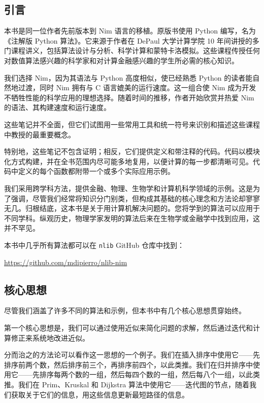 \documentclass[justified, sixbynine]{tufte-book}
\def\ft{\small\tt}
\theoremstyle{plain}%
\newtheorem * {corollary}{推论}
\theoremstyle{definition}
\theoremstyle{remark}
\newtheorem * {remark}{注记}
\newtheorem * {note}{注释}
\begin{document}
\mainmatter
\begin{fullwidth}

\goodbreak\chapter{引言}

本书是同一位作者先前版本到 Nim 语言的移植。原版书使用 Python 编写，名为《注解版 Python 算法》。它来源于作者在 DePaul 大学计算学院 10 年间讲授的多门课程讲义，包括算法设计与分析、科学计算和蒙特卡洛模拟。这些课程传授任何对数值算法感兴趣的科学家和对计算金融感兴趣的学生所必需的核心知识。

我们选择 Nim，因为其语法与 Python 高度相似，使已经熟悉 Python 的读者能自然地过渡，同时 Nim 拥有与 C 语言媲美的运行速度。这一组合使 Nim 成为开发不牺牲性能的科学应用的理想选择。随着时间的推移，作者开始欣赏并热爱 Nim 的语法、其构建速度和运行速度。

这些笔记并不全面，但它们试图用一些常用工具和统一符号来识别和描述这些课程中教授的最重要概念。

特别地，这些笔记不包含证明；相反，它们提供定义和带注释的代码。代码以模块化方式构建，并在全书范围内尽可能多地复用，以便计算的每一步都清晰可见。代码中定义的每个函数都附带一个或多个实际应用示例。

我们采用跨学科方法，提供金融、物理、生物学和计算机科学领域的示例。这是为了强调，尽管我们经常将知识分门别类，但构成其基础的核心理念和方法论却寥寥无几。归根结底，这本书是关于用计算机解决问题的。您将学到的算法可以应用于不同学科。纵观历史，物理学家发明的算法后来在生物学或金融学中找到应用，这并不罕见。

本书中几乎所有算法都可以在 {\ft nlib} GitHub 仓库中找到：

\url{https://github.com/mdipierro/nlib-nim}

\section{核心思想}

尽管我们涵盖了许多不同的算法和示例，但本书中有几个核心思想贯穿始终。

第一个核心思想是，我们可以通过使用近似来简化问题的求解，然后通过迭代和计算修正来系统地改进近似。

分而治之的方法论可以看作这一思想的一个例子。我们在插入排序中使用它——先排序前两个数，然后排序前三个，再排序前四个，以此类推。我们在归并排序中使用它——先排序每两个数的一组，然后每四个数的一组，然后每八个一组，以此类推。我们在 Prim、Kruskal 和 Dijkstra 算法中使用它——迭代图的节点，随着我们获取关于它们的信息，用这些信息更新最短路径的信息。


\end{fullwidth}
\end{document}
